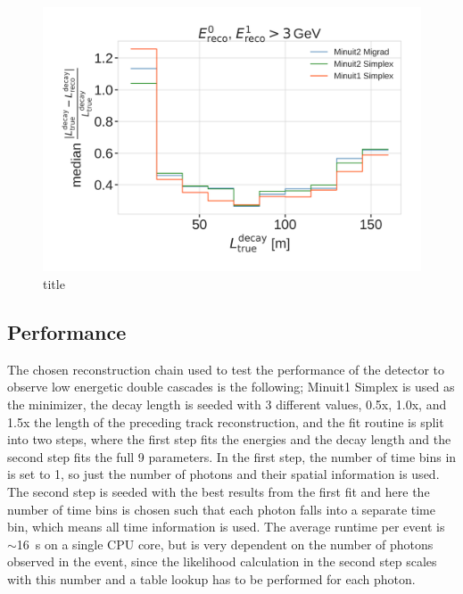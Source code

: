 \begin{figure}[h]
    \includegraphics{figures/results/190605_reco_optimization/minimizer_checks_median_decay_length_resolution_Good + L7 + reco E1,E2 above 3.png}
    \caption[short]{title}
\end{figure}


\subsection{Performance}

The chosen reconstruction chain used to test the performance of the detector to observe low energetic double cascades is the following; Minuit1 Simplex is used as the minimizer, the decay length is seeded with 3 different values, 0.5x, 1.0x, and 1.5x the length of the preceding track reconstruction, and the fit routine is split into two steps, where the first step fits the energies and the decay length and the second step fits the full 9 parameters. In the first step, the number of time bins in  is set to 1, so just the number of photons and their spatial information is used. The second step is seeded with the best results from the first fit and here the number of time bins is chosen such that each photon falls into a separate time bin, which means all time information is used. The average runtime per event is $\sim$\SI{16}{\second} on a single CPU core, but is very dependent on the number of photons observed in the event, since the likelihood calculation in the second step scales with this number and a table lookup has to be performed for each photon.

